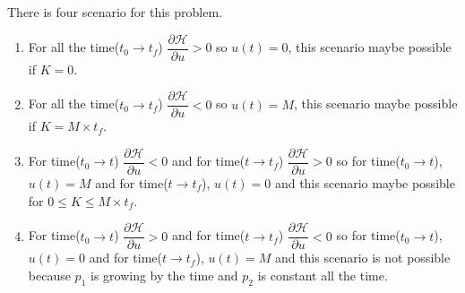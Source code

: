 There is four scenario for this problem.
\begin{enumerate}
	\item For all the time($t_0\to t_f$) $\dfrac{\partial \mathcal{H}}{\partial u} > 0$ so $u(t) = 0$, this scenario maybe possible if $K = 0$.
	\item For all the time($t_0\to t_f$) $\dfrac{\partial \mathcal{H}}{\partial u} < 0$ so $u(t) = M$, this scenario maybe possible if $K = M\times t_f$.
	\item For time($t_0\to t $) $\dfrac{\partial \mathcal{H}}{\partial u} < 0$ and 
	for time($t\to t_f $) $\dfrac{\partial \mathcal{H}}{\partial u} > 0$ so for time($t_0\to t $), $u(t) = M$ and  for time($t\to t_f$), $u(t) = 0$ and this scenario maybe possible for $0 \leq K \leq M\times t_f$.
	\item For time($t_0\to t $) $\dfrac{\partial \mathcal{H}}{\partial u} > 0$ and 
	for time($t\to t_f $) $\dfrac{\partial \mathcal{H}}{\partial u} < 0$ so for time($t_0\to t $), $u(t) = 0$ and  for time($t\to t_f$), $u(t) = M$ and this scenario is not possible because $p_1$ is growing by the time and $p_2$ is constant all the time.  
\end{enumerate}
